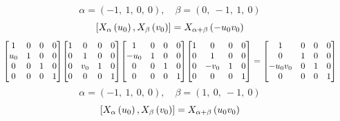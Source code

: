 \documentclass[11pt]{article}
\theoremstyle{definition}
\begin{document}
\[
\alpha = \left( -1, \  1, \  0, \  0\right), \quad \beta = \left( 0, \  -1, \  1, \  0\right)
\]
\[
\scaletoalign{\textwidth}{\left[ X_{\alpha}\left(u_{0}\right), X_{\beta}\left(v_{0}\right) \right] = X_{\alpha + \beta}\left(- u_{0} v_{0}\right)}
\]
\[
\scaletoalign{\textwidth}{{\left[\begin{matrix}1 & 0 & 0 & 0\\u_{0} & 1 & 0 & 0\\0 & 0 & 1 & 0\\0 & 0 & 0 & 1\end{matrix}\right]} {\left[\begin{matrix}1 & 0 & 0 & 0\\0 & 1 & 0 & 0\\0 & v_{0} & 1 & 0\\0 & 0 & 0 & 1\end{matrix}\right]} {\left[\begin{matrix}1 & 0 & 0 & 0\\- u_{0} & 1 & 0 & 0\\0 & 0 & 1 & 0\\0 & 0 & 0 & 1\end{matrix}\right]} {\left[\begin{matrix}1 & 0 & 0 & 0\\0 & 1 & 0 & 0\\0 & - v_{0} & 1 & 0\\0 & 0 & 0 & 1\end{matrix}\right]} = {\left[\begin{matrix}1 & 0 & 0 & 0\\0 & 1 & 0 & 0\\- u_{0} v_{0} & 0 & 1 & 0\\0 & 0 & 0 & 1\end{matrix}\right]}}
\]
\[
\alpha = \left( -1, \  1, \  0, \  0\right), \quad \beta = \left( 1, \  0, \  -1, \  0\right)
\]
\[
\scaletoalign{\textwidth}{\left[ X_{\alpha}\left(u_{0}\right), X_{\beta}\left(v_{0}\right) \right] = X_{\alpha + \beta}\left(u_{0} v_{0}\right)}
\]
\end{document}
